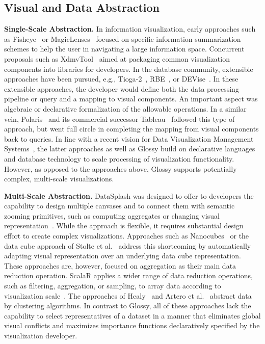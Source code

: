 \documentclass[11pt, oneside]{report}
\newcommand{\minisec}[1]{\noindent\textbf{#1.}}
\begin{document}
{\subsection{Visual and Data Abstraction}
\label{sec:related:abstraction}

\minisec{Single-Scale Abstraction}
In information visualization, early approaches such as Fisheye~\cite{Sarkar:1994:Fisheye} or MagicLenses~\cite{BierSPBD93:MagicLenses} focused on specific information summarization schemes to help the user in navigating a large information space. Concurrent proposals such as XdmvTool~\cite{Ward:1994:XmdvTool} aimed at packaging common visualization components into libraries for developers. In the database community, extensible approaches have been pursued, e.g., Tioga-2~\cite{AikenCSW96:Tioga2}, RBE~\cite{KrishnamurthyZ95:RBE}, or DEVise~\cite{Livny:1997:DEVise}. In these extensible approaches, the developer would define both the data processing pipeline or query and a mapping to visual components. An important aspect was algebraic or declarative formalization of the allowable operations. In a similar vein, Polaris~\cite{StolteTH2008:Polaris} and its commercial successor Tableau~\cite{hanrahan:enthusiast} followed this type of approach, but went full circle in completing the mapping from visual components back to queries. In line with a recent vision for Data Visualization Management Systems~\cite{wu:case}, the latter approaches as well as Glossy build on declarative languages and database technology to scale processing of visualization functionality. However, as opposed to the approaches above, Glossy supports potentially complex, multi-scale visualizations.  

\minisec{Multi-Scale Abstraction}
DataSplash was designed to offer to developers the capability to design multiple canvases and to connect them with semantic zooming primitives, such as computing aggregates or changing visual representation~\cite{WoodruffOACELSS01:DataSplash}. While the approach is flexible, it requires substantial design effort to create complex visualizations. Approaches such as Nanocubes~\cite{LinsKS13:Nanocubes} or the data cube approach of Stolte et al.~\cite{StolteTH:2003:Multiscale} address this shortcoming by automatically adapting visual representation over an underlying data cube representation. These approaches are, however, focused on aggregation as their main data reduction operation. ScalaR applies a wider range of data reduction operations, such as filtering, aggregation, or sampling, to array data according to visualization scale~\cite{BattleSC13:DynamicReduction}. The approaches of Healy~\cite{Healey96:MultidimensionalViz} and Artero et al.~\cite{ArteroOL04:ClustersViz} abstract data by clustering algorithms. In contrast to Glossy, all of these approaches lack the capability to select representatives of a dataset in a manner that eliminates global visual conflicts and maximizes importance functions declaratively specified by the visualization developer.     

}
\end{document}
